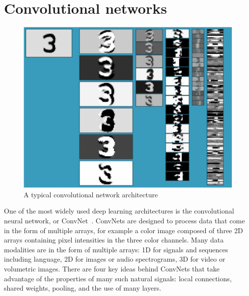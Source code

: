 \documentclass[10pts]{article}
\begin{document}
\section{Convolutional networks}


\begin{figure}
\begin{center}
  \vspace{0.2cm}
  \includegraphics[width=0.70\linewidth]{convnet-diagram}
\end{center}
\vspace{-0.6cm}
\caption{A typical convolutional network architecture}
\vspace{-0.8cm}
\label{fig:convnet}
\end{figure}

One of the most widely used deep learning architectures is the
convolutional neural network, or
ConvNet~\cite{lecun-90c,lecun-98}. ConvNets are designed to process
data that come in the form of multiple arrays, for example a color
image composed of three 2D arrays containing pixel intensities in the
three color channels. Many data modalities are in the form of multiple
arrays: 1D for signals and sequences including language, 2D for images
or audio spectrograms, 3D for video or volumetric images.  There are
four key ideas behind ConvNets that take advantage of the properties
of many such natural signals: local connections, shared weights,
pooling, and the use of many layers.
\end{document}
